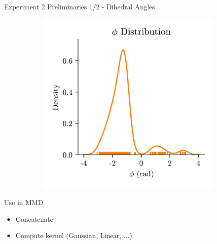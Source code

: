 \documentclass[aspectratio=169, 10pt, dvipsnames, handout]{beamer}
\begin{document}
{\begin{frame}[fragile]{Experiment 2 Preliminaries 1/2 - Dihedral Angles}
\begin{minipage}{0.3\textwidth}
\begin{adjustbox}{minipage=\linewidth,scale=0.8}
\begin{figure}
\begin{subfigure}{\textwidth}
          \end{subfigure}
          \begin{subfigure}{\textwidth}
            \includegraphics[width=\textwidth]{./figures/dehedral_dist_phi.png}
          \end{subfigure}
        \end{figure}
      \end{adjustbox}
    \end{minipage}
    \pause\begin{minipage}{0.28\textwidth}
      \begin{alert}{Use in MMD}
        \begin{itemize}
        \item\small Concatenate
        \item\small Compute kernel (Gaussian, Linear, ...)
        \end{itemize}

      \end{alert}
    \end{minipage}
  \end{frame}
}
\end{document}
